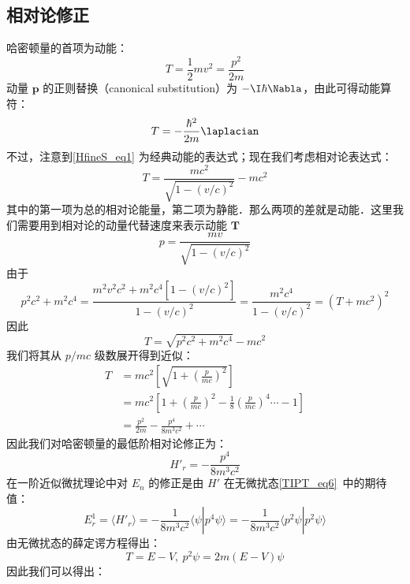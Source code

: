 \subsection{相对论修正}
哈密顿量的首项为动能：
\begin{equation}\label{HfineS_eq1}
T=\frac{1}{2}mv^2=\frac{p^2}{2m}
\end{equation}
动量 $\mathbf p$ 的正则替换（canonical substitution）为 $-\I\hbar\Nabla$，由此可得动能算符：
\begin{equation}
T=-\frac{\hbar^2}{2m}\laplacian
\end{equation}
不过，注意到\autoref{HfineS_eq1} 为经典动能的表达式；现在我们考虑相对论表达式：
\begin{equation}
T=\frac{mc^2}{\sqrt{1-(v/c)^2}}-mc^2
\end{equation}
其中的第一项为总的相对论能量，第二项为静能．那么两项的差就是动能．这里我们需要用到相对论的动量代替速度来表示动能 $\mathbf T$
\begin{equation}
p=\frac{mv}{\sqrt{1-(v/c)^2}}
\end{equation}
由于
\begin{equation}
p^2c^2+m^2c^4=\frac{m^2v^2c^2+m^2c^4[1-(v/c)^2]}{1-(v/c)^2}=\frac{m^2c^4}{1-(v/c)^2}=(T+mc^2)^2
\end{equation}
因此
\begin{equation}
T=\sqrt{p^2c^2+m^2c^4}-mc^2
\end{equation}
我们将其从 $p/mc$ 级数展开得到近似：
\begin{align}
T &= mc^2\left[\sqrt{1+\left(\frac{p}{mc}\right)^2}\right]\\ 
&=mc^2\left[1+\left(\frac{p}{mc}\right)^2-\frac{1}{8}\left(\frac{p}{mc}\right)^4\cdots -1\right]\\
&=\frac{p^2}{2m}-\frac{p^4}{8m^3c^2}+\cdots
\end{align}
因此我们对哈密顿量的最低阶相对论修正为：
\begin{equation}
H'_r=-\frac{p^4}{8m^3c^2}
\end{equation}
在一阶近似微扰理论中对 $E_n$ 的修正是由 $H'$ 在无微扰态\autoref{TIPT_eq6}~中的期待值：
\begin{equation}\label{HfineS_eq16}
E_r^1=\langle H'_r\rangle=-\frac{1}{8m^3c^2}\langle\psi|p^4\psi\rangle=-\frac{1}{8m^3c^2}\langle p^2\psi|p^2\psi\rangle
\end{equation}
由无微扰态的薛定谔方程得出：
\begin{equation}
T=E-V, \ p^2\psi = 2m(E-V)\psi
\end{equation}
因此我们可以得出：
